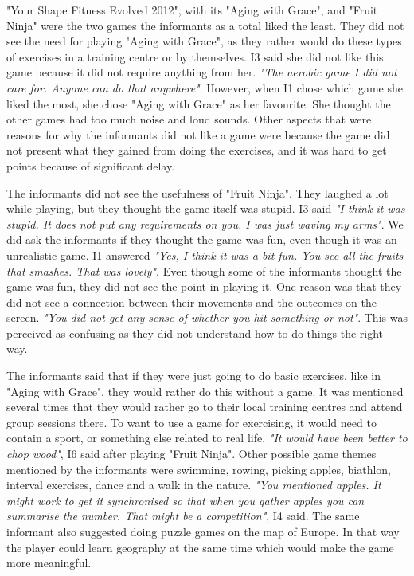 "Your Shape Fitness Evolved 2012", with its "Aging with Grace", and "Fruit Ninja" were the two games the informants as a total liked the least. They did not see the need for playing "Aging with Grace", as they rather would do these types of exercises in a training centre or by themselves. I3 said she did not like this game because it did not require anything from her. \emph{"The aerobic game I did not care for. Anyone can do that anywhere"}. However, when I1 chose which game she liked the most, she chose "Aging with Grace" as her favourite. She thought the other games had too much noise and loud sounds. Other aspects that were reasons for why the informants did not like a game were because the game did not present what they gained from doing the exercises, and it was hard to get points because of significant delay. 

The informants did not see the usefulness of "Fruit Ninja". They laughed a lot while playing, but they thought the game itself was stupid. I3 said \emph{"I think it was stupid. It does not put any requirements on you. I was just waving my arms"}. We did ask the informants if they thought the game was fun, even though it was an unrealistic game. I1 answered \emph{"Yes, I think it was a bit fun. You see all the fruits that smashes. That was lovely"}. Even though some of the informants thought the game was fun, they did not see the point in playing it. One reason was that they did not see a connection between their movements and the outcomes on the screen. \emph{"You did not get any sense of whether you hit something or not"}. This was perceived as confusing as they did not understand how to do things the right way. 

The informants said that if they were just going to do basic exercises, like in "Aging with Grace", they would rather do this without a game. It was mentioned several times that they would rather go to their local training centres and attend group sessions there. To want to use a game for exercising, it would need to contain a sport, or something else related to real life. \emph{"It would have been better to chop wood"}, I6 said after playing "Fruit Ninja". Other possible game themes mentioned by the informants were swimming, rowing, picking apples, biathlon, interval exercises, dance and a walk in the nature. \emph{"You mentioned apples. It might work to get it synchronised so that when you gather apples you can summarise the number. That might be a competition"}, I4 said. The same informant also suggested doing puzzle games on the map of Europe. In that way the player could learn geography at the same time which would make the game more meaningful.

